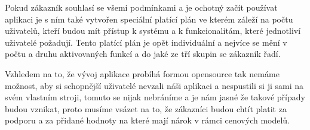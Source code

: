 \par Pokud zákazník souhlasí se všemi podmínkami a je ochotný začít používat aplikaci je s ním také vytvořen speciální platící plán ve kterém záleží na počtu uživatelů, kteří budou mít přístup k systému a k funkcionalitám, které jednotliví uživatelé požadují. Tento platící plán je opět individuální a nejvíce se mění v počtu a druhu aktivovaných funkcí a do jaké ze tří skupin se zákazník řadí.

\par Vzhledem na to, že vývoj aplikace probíhá formou opensource tak nemáme možnost, aby si schopnější uživatelé nevzali náši aplikaci a nespustili si ji sami na svém vlastním stroji, tomuto se nijak nebráníme a je nám jasné že takové případy budou vznikat, proto musíme vsázet na to, že zákazníci budou chtít platit za podporu a za přidané hodnoty na které mají nárok v rámci cenových modelů.